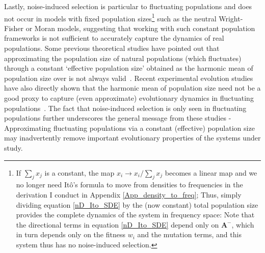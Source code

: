 Lastly, noise-induced selection is particular to fluctuating populations and does not occur in models with fixed population sizes\footnote{If $\sum_j x_j$ is a constant, the map $x_i \to x_i/\sum_j x_j$ becomes a linear map and we no longer need It\^o's formula to move from densities to frequencies in the derivation I conduct in Appendix \ref{App_density_to_freq}; Thus, simply dividing equation \eqref{nD_Ito_SDE} by the (now constant) total population size provides the complete dynamics of the system in frequency space: Note that the directional terms in equation \eqref{nD_Ito_SDE} depend only on $\mathbf{A}^-$, which in turn depends only on the fitness $w_i$ and the mutation terms, and this system thus has no noise-induced selection.} such as the neutral Wright-Fisher or Moran models, suggesting that working with such constant population frameworks is not sufficient to accurately capture the dynamics of real populations. Some previous theoretical studies have pointed out that approximating the population size of natural populations (which fluctuates) through a constant `effective population size' obtained as the harmonic mean of population size over is not always valid~\citep{sjodin_meaning_2005,abu_awad_effects_2018,kuosmanen_turnover_2022}. Recent experimental evolution studies have also directly shown that the harmonic mean of population size need not be a good proxy to capture (even approximate) evolutionary dynamics in fluctuating populations~\citep{chavhan_larger_2019}. The fact that noise-induced selection is only seen in fluctuating populations further underscores the general message from these studies - Approximating fluctuating populations via a constant (effective) population size may inadvertently remove important evolutionary properties of the systems under study.

